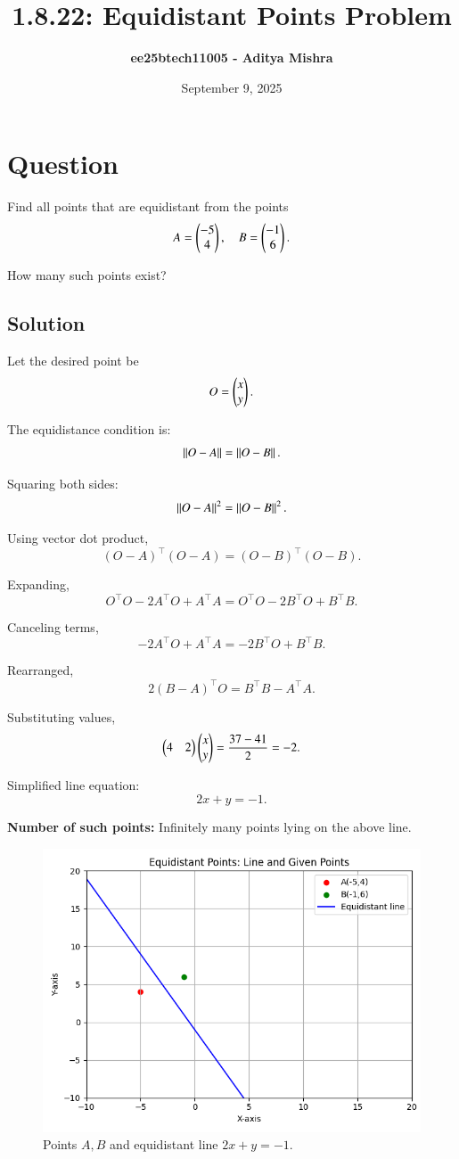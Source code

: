 \documentclass[12pt]{article}
\title{\textbf{1.8.22: Equidistant Points Problem}}
\author{\textbf{ee25btech11005 - Aditya Mishra}}
\date{September 9, 2025}
\begin{document}
\maketitle

\section*{Question}

Find all points that are equidistant from the points 
\[
A = \begin{pmatrix}-5 \\ 4\end{pmatrix}, \quad B = \begin{pmatrix}-1 \\ 6\end{pmatrix}.
\]

How many such points exist?

\subsection*{Solution}

Let the desired point be 
\[
O = \begin{pmatrix}x \\ y\end{pmatrix}.
\]

The equidistance condition is:
\[
\left\Vert O - A \right\Vert = \left\Vert O - B \right\Vert.
\]

Squaring both sides:
\[
\left\Vert O - A \right\Vert^2 = \left\Vert O - B \right\Vert^2.
\]

Using vector dot product,
\[
(O - A)^\top (O - A) = (O - B)^\top (O - B).
\]

Expanding,
\[
O^\top O - 2 A^\top O + A^\top A = O^\top O - 2 B^\top O + B^\top B.
\]

Canceling terms,
\[
-2 A^\top O + A^\top A = -2 B^\top O + B^\top B.
\]

Rearranged,
\[
2 (B - A)^\top O = B^\top B - A^\top A.
\]

Substituting values,
\[
\begin{pmatrix}4 & 2\end{pmatrix} \begin{pmatrix}x \\ y\end{pmatrix} = \frac{37 - 41}{2} = -2.
\]

Simplified line equation:
\[
2x + y = -1.
\]

\textbf{Number of such points:} Infinitely many points lying on the above line.

\begin{figure}[h]
\centering
\includegraphics[width=0.8\columnwidth]{figs/equidistant_plot.png}
\caption{Points \(A, B\) and equidistant line \(2x + y = -1\).}
\label{fig:equidistant_plot}
\end{figure}
\end{document}
